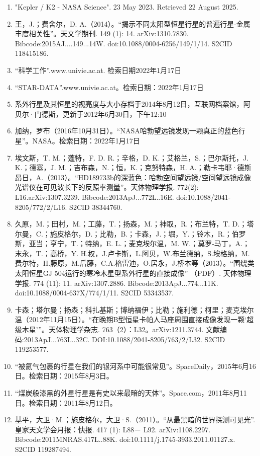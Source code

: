 \begin{enumerate}
\item "Kepler / K2 - NASA Science". 23 May 2023. Retrieved 22 August 2025.
\item 王，J.；费舍尔，D. A.（2014）。“揭示不同太阳型恒星行星的普遍行星-金属丰度相关性”。天文学期刊. 149 (1): 14. arXiv:1310.7830. Bibcode:2015AJ....149...14W. doi:10.1088/0004-6256/149/1/14. S2CID 118415186.
\item “科学工作”.www.univie.ac.at. 检索日期2022年1月17日
\item “STAR-DATA”.www.univie.ac.at。检索日期：2022年1月17日
\item 系外行星及其恒星的视亮度与大小存档于2014年8月12日，互联网档案馆，阿贝尔·门德斯，更新于2012年6月30日，下午12:10
\item 加纳，罗布（2016年10月31日）。“NASA哈勃望远镜发现一颗真正的蓝色行星”。NASA。检索日期：2022年1月17日
\item 埃文斯，T. M.；蓬特，F. D. R.；辛格，D. K.；艾格兰，S.；巴尔斯托，J. K.；德塞，J. M.；吉布森，N.；恒，K.；克努特森，H. A.；勒卡韦耶·德斯昂日，A.（2013）。“HD189733b的深蓝色：哈勃空间望远镜/空间望远镜成像光谱仪在可见波长下的反照率测量”。天体物理学报. 772(2): L16.arXiv:1307.3239. Bibcode:2013ApJ...772L..16E. doi:10.1088/2041-8205/772/2/L16. S2CID 38344760.
\item 久原，M.；田村，M.；工藤，T.；扬森，M.；神取，R.；布兰特，T. D.；塔尔曼，C.；施皮格尔，D.；比勒，B.；卡森，J.；堀，Y.；铃木，R.；伯罗斯，亚当；亨宁，T.；特纳，E. L.；麦克埃尔温，M. W.；莫罗-马丁，A.；末永，T.；高桥，Y. H.权，J.卢卡斯，L.阿贝，W.布兰德纳，S.埃格纳，M.费尔特，H.藤原，M.后藤，C.A.格雷迪，O.居永，J.桥本等（2013）。“围绕类太阳恒星GJ 504运行的寒冷木星型系外行星的直接成像” （PDF）. 天体物理学报. 774 (11): 11. arXiv:1307.2886. Bibcode:2013ApJ...774...11K. doi:10.1088/0004-637X/774/1/11. S2CID 53343537.
\item 卡森；塔尔曼；扬森；科扎基斯；博纳福伊；比勒；施利德；柯里；麦克埃尔温（2012年11月15日）。“在晚期B型恒星卡帕人马座周围直接成像发现一颗‘超级木星’”。天体物理学杂志. 763（2）：L32。arXiv:1211.3744. 文献编码:2013ApJ...763L..32C. DOI:10.1088/2041-8205/763/2/L32. S2CID 119253577.
\item “被氦气包裹的行星在我们的银河系中可能很常见”。SpaceDaily，2015年6月16日。检索日期：2015年8月3日。
\item “煤炭般漆黑的外星行星是有史以来最暗的天体”。Space.com，2011年8月11日。检索日期：2011年8月12日。
\item 基平，大卫·M.；施皮格尔，大卫·S.（2011）。“从最黑暗的世界探测可见光”. 皇家天文学会月报：快报. 417 (1): L88－ L92. arXiv:1108.2297. Bibcode:2011MNRAS.417L..88K. doi:10.1111/j.1745-3933.2011.01127.x. S2CID 119287494.

\end{enumerate}
